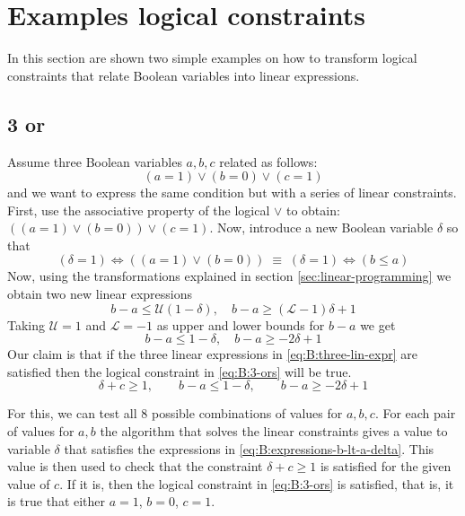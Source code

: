 \section{Examples logical constraints}
\label{sec:examples-logical-constraints}

In this section are shown two simple examples on how to transform logical
constraints that relate Boolean variables into linear expressions.

\subsection{3 or}
\label{sec:examples-logical-constraints:3-ors}

Assume three Boolean variables $a,b,c$ related as follows:
\begin{equation}
\label{eq:B:3-ors}
(a = 1) \vee (b = 0) \vee (c = 1)
\end{equation}
and we want to express the same condition but with a series of
linear constraints. First, use the associative property of the logical $\vee$
to obtain: $((a = 1) \vee (b = 0)) \vee (c = 1)$.
Now, introduce a new Boolean variable $\delta$ so that
\[
(\delta = 1) \Longleftrightarrow ((a = 1) \vee (b = 0))
\;\equiv\;
(\delta = 1) \Longleftrightarrow (b \le a)
\]
Now, using the transformations explained in section \ref{sec:linear-programming}
we obtain two new linear expressions
\[
b - a \le \mathcal{U}(1 - \delta), \quad b - a \ge (\mathcal{L} - 1)\delta + 1
\]
Taking $\mathcal{U}=1$ and $\mathcal{L}=-1$ as upper and lower bounds for $b - a$
we get
\begin{equation}
\label{eq:B:expressions-b-lt-a-delta}
b - a \le 1 - \delta, \quad b - a \ge -2\delta + 1
\end{equation}
Our claim is that if the three linear expressions in \ref{eq:B:three-lin-expr}
are satisfied then the logical constraint in \ref{eq:B:3-ors} will be true.
\begin{equation}
\label{eq:B:three-lin-expr}
\delta + c \ge 1,\qquad b - a \le 1 - \delta,\qquad b - a \ge -2\delta + 1
\end{equation}

For this, we can test all 8 possible combinations of values for $a,b,c$. For each pair
of values for $a,b$ the algorithm that solves the linear constraints gives a value to
variable $\delta$ that satisfies the expressions in \ref{eq:B:expressions-b-lt-a-delta}.
This value is then used to check that the constraint $\delta + c \ge 1$ is satisfied
for the given value of $c$. If it is, then the logical constraint in \ref{eq:B:3-ors}
is satisfied, that is, it is true that either $a=1$, $b=0$, $c=1$.

